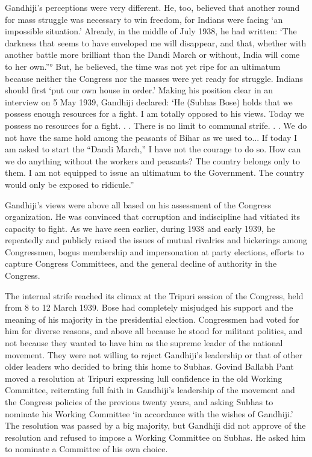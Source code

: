 Gandhiji’s perceptions were very different. He, too, believed that another round for mass struggle was necessary to win freedom, for Indians were facing ‘an impossible situation.’ Already, in the middle of July 1938, he had written: ‘The darkness that seems to have enveloped me will disappear, and that, whether with another battle more brilliant than the Dandi March or without, India will come to her own.”° But, he believed, the time was not yet ripe for an ultimatum because neither the Congress nor the masses were yet ready for struggle. Indians should first ‘put our own house in order.’ Making his position clear in an interview on 5 May 1939, Gandhiji declared: ‘He (Subhas Bose) holds that we possess enough resources for a fight. I am totally opposed to his views. Today we possess no resources for a fight. . . There is no limit to communal strife. . . We do not have the same hold among the peasants of Bihar as we used to... If today I am asked to start the “Dandi March,” I have not the courage to do so. How can we do anything without the workers and peasants? The country belongs only to them. I am not equipped to issue an ultimatum to the Government. The country would only be exposed to ridicule.” 

Gandhiji’s views were above all based on his assessment of the Congress organization. He was convinced that corruption and indiscipline had vitiated its capacity to fight. As we have seen earlier, during 1938 and early 1939, he repeatedly and publicly raised the issues of mutual rivalries and bickerings among Congressmen, bogus membership and impersonation at party elections, efforts to capture Congress Committees, and the general decline of authority in the Congress. 

The internal strife reached its climax at the Tripuri session of the Congress, held from 8 to 12 March 1939. Bose had completely misjudged his support and the meaning of his majority in the presidential election. Congressmen had voted for him for diverse reasons, and above all because he stood for militant politics, and not because they wanted to have him as the supreme leader of the national movement. They were not willing to reject Gandhiji’s leadership or that of other older leaders who decided to bring this home to Subhas. Govind Ballabh Pant moved a resolution at Tripuri expressing lull confidence in the old Working Committee, reiterating full faith in Gandhiji’s leadership of the movement and the Congress policies of the previous twenty years, and asking Subhas to nominate his Working Committee ‘in accordance with the wishes of Gandhiji.’ The resolution was passed by a big majority, but Gandhiji did not approve of the resolution and refused to impose a Working Committee on Subhas. He asked him to nominate a Committee of his own choice. 

